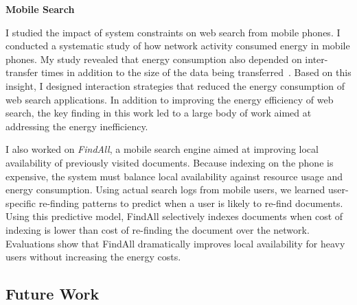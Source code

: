 \documentclass[a4paper,11pt,onecolumn]{article}
\begin{document}
{\bf Mobile Search}

I studied the impact of system constraints on web search from mobile phones. I conducted a systematic study of how network activity consumed energy in mobile phones. My study revealed that energy consumption also depended on inter-transfer times in addition to the size of the data being transferred~\cite{balasubramanian-imc09}. Based on this insight, I designed interaction strategies that reduced the energy consumption of web search applications. In addition to improving the energy efficiency of web search, the key finding in this work led to a large body of work aimed at addressing the energy inefficiency.

I also worked on {\em FindAll}, a mobile search engine aimed at improving local availability of previously visited documents. Because indexing on the phone is expensive, the system must balance local availability against resource usage and energy consumption. Using actual search logs from mobile users, we learned user-specific re-finding patterns to predict when a user is likely to re-find documents. Using this predictive model, FindAll selectively indexes documents when cost of indexing is lower than cost of re-finding the document over the network. Evaluations show that FindAll dramatically improves local availability for heavy users without increasing the energy costs.

\subsection*{Future Work}
\end{document}
